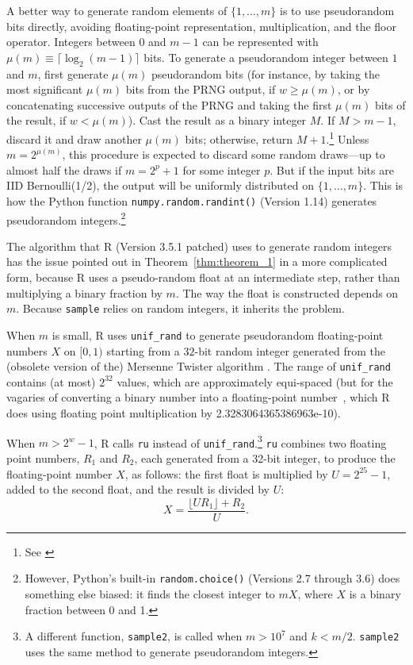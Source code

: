 \documentclass[12pt]{article}
\begin{document}
A better way to generate random elements of $\{1, \dots, m\}$ is to use pseudorandom bits directly,
avoiding floating-point representation, multiplication, and the floor operator. 
Integers between $0$ and $m-1$ can be represented with $\mu(m) \equiv \lceil \log_2(m-1) \rceil$ bits. 
To generate a pseudorandom integer between $1$ and $m$, first generate 
$\mu(m)$ pseudorandom bits (for instance, by taking the most significant $\mu(m)$ bits from the PRNG output, if $w \ge \mu(m)$, or by concatenating successive outputs of the PRNG and taking the
first $\mu(m)$ bits of the result, if $w < \mu(m)$).
Cast the result as a binary integer $M$.  
If $M > m-1$, discard it and draw another $\mu(m)$ bits; otherwise, return $M+1$.\footnote{%
   See \citet[p.114]{knuth_art_1997}
}
Unless $m = 2^{\mu(m)}$, this procedure is expected to discard some random draws---up to almost 
half the draws if $m = 2^p+1$ for some integer $p$.
But if the input bits are IID Bernoulli(1/2), the output will be uniformly distributed on $\{1, \ldots, m\}$.
This is how the Python function \texttt{numpy.random.randint()} (Version 1.14) generates pseudorandom integers.\footnote{%
  However, Python's built-in \texttt{random.choice()} (Versions 2.7 through 3.6) does 
  something else biased: it finds the closest integer to $mX$, where $X$ is a binary fraction 
  between 0 and 1.
}

The algorithm that R (Version 3.5.1 patched) \citep{R_2018} uses to generate random integers
has the issue pointed out in Theorem~\ref{thm:theorem_1} in a more complicated form, 
because R uses a pseudo-random float at an intermediate step, rather than multiplying a binary fraction
by $m$.
The way the float is constructed depends on $m$.
Because \texttt{sample} relies on random integers, it inherits the problem.

When $m$ is small, R uses \texttt{unif\_rand} to generate pseudorandom floating-point 
numbers $X$ on $[0, 1)$ starting from a $32$-bit random integer generated from the
(obsolete version of the) Mersenne Twister algorithm \citep{mt1998}.
The range of \texttt{unif\_rand} contains 
(at most) $2^32$ values, which are approximately equi-spaced (but for the vagaries of converting
a binary number into a floating-point number~\citep{goldberg91}, which
R does using floating point multiplication by 2.3283064365386963e-10).

When $m > 2^w-1$, R calls \texttt{ru} instead of \texttt{unif\_rand}.\footnote{
   A different function, \texttt{sample2}, is called when $m > 10^7$ and $k < m/2$.
\texttt{sample2} uses the same method to generate pseudorandom integers.
}
\texttt{ru} combines two floating point numbers, $R_1$ and $R_2$, each generated from a 32-bit integer, 
to produce the floating-point number $X$, as follows:
the first float is multiplied by $U = 2^{25}-1$, added to the second float, and the result is divided by
$U$:
$$ X = \frac{\lfloor U R_1 \rfloor + R_2}{U}.$$
\end{document}
